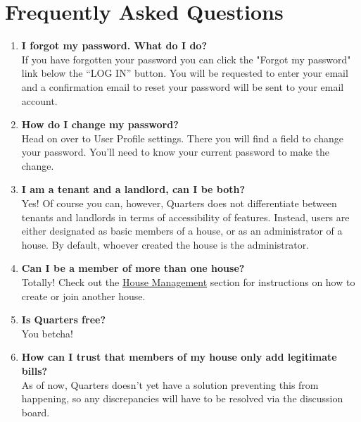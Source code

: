 \documentclass[12pt]{article}
\begin{document}
    \section{Frequently Asked Questions}
    \begin{enumerate}
    \item \textbf{I forgot my password. What do I do?} \\
    If you have forgotten your password you can click the "Forgot my password" link below the ``LOG IN'' button. You will be requested to enter your email and a confirmation email to reset your password will be sent to your email account.
    \item \textbf{How do I change my password?} \\
    Head on over to User Profile settings. There you will find a field to change your password. You'll need to know your current password to make the change.
    \item \textbf{I am a tenant and a landlord, can I be both?} \\
    Yes! Of course you can, however, Quarters does not differentiate between tenants and landlords in terms of accessibility of features. Instead, users are either designated as basic members of a house, or as an administrator of a house. By default, whoever created the house is the administrator.
    \item \textbf{Can I be a member of more than one house?} \\
    Totally! Check out the \hyperref[sec:housemanagement]{House Management}  section for instructions on how to create or join another house.
    \item \textbf{Is Quarters free?} \\
    You betcha!
    \item \textbf{How can I trust that members of my house only add legitimate bills?} \\
    As of now, Quarters doesn't yet have a solution preventing this from happening, so any discrepancies will have to be resolved via the discussion board.
    \end{enumerate}

\end{document}
